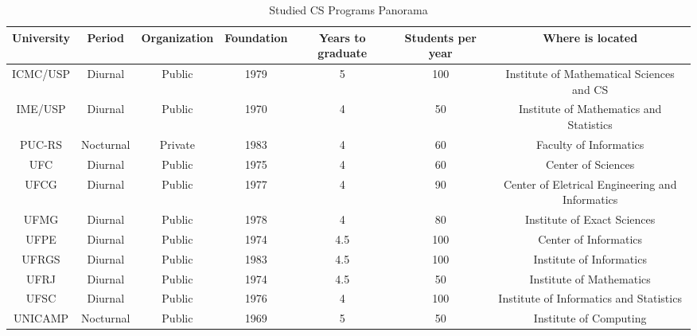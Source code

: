 \documentclass[conference]{IEEEtran}
\begin{document}
\begin{table}
	\centering
	\caption{Studied CS Programs Panorama}
    \begin{tabular}{|c|c|c|c|c|c|c|}
        \hline
        University              & Period    & Organization & Foundation & Years to graduate & Students per year & Where is located                                   \\ \hline
        ICMC/USP \cite{fuvest}  & Diurnal   & Public       & 1979       & 5                 & 100               & Institute of Mathematical Sciences and CS        \\ 
        IME/USP \cite{fuvest}   & Diurnal   & Public       & 1970       & 4                 & 50                & Institute of Mathematics and Statistics          \\ 
        PUC-RS\cite{vest_pucrs} & Nocturnal & Private      & 1983       & 4                 & 60                & Faculty of Informatics                           \\ 
        UFC \cite{vest_ufc}     & Diurnal   & Public       & 1975       & 4                 & 60                & Center of Sciences                               \\ 
        UFCG \cite{vest_ufcg}   & Diurnal   & Public       & 1977       & 4                 & 90                & Center of Eletrical Engineering and Informatics  \\ 
        UFMG \cite{vest_ufmg}   & Diurnal   & Public       & 1978       & 4                 & 80                & Institute of Exact Sciences                      \\ 
        UFPE \cite{vest_ufpe}   & Diurnal   & Public       & 1974       & 4.5               & 100               & Center of Informatics                            \\ 
        UFRGS \cite{vest_ufrgs} & Diurnal   & Public       & 1983       & 4.5               & 100               & Institute of Informatics                         \\ 
        UFRJ \cite{vest_ufrj}   & Diurnal   & Public       & 1974       & 4.5               & 50                & Institute of Mathematics                         \\ 
        UFSC \cite{vest_ufsc}   & Diurnal   & Public       & 1976       & 4                 & 100               & Institute of Informatics and Statistics          \\ 
        UNICAMP\cite{vest_ucp}  & Nocturnal & Public       & 1969       & 5                 & 50                & Institute of Computing                           \\
        \hline
    \end{tabular}
\end{table}
\end{document}
